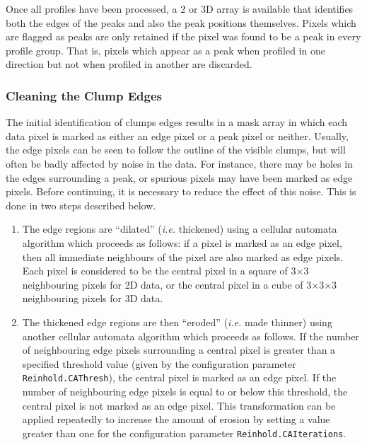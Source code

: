\documentclass[twoside,11pt]{article}
\renewcommand{\_}{\texttt{\symbol{95}}}
\begin{document}
Once all profiles have been processed, a 2 or 3D array is available that
identifies both the edges of the peaks and also the peak positions
themselves. Pixels which are flagged as peaks are only retained if the
pixel was found to be a peak in every profile group. That is, pixels
which appear as a peak when profiled in one direction but not when
profiled in another are discarded.

\subsubsection{Cleaning the Clump Edges}
The initial identification of clumps edges results in a mask array in
which each data pixel is marked as either an edge pixel or a peak pixel
or neither. Usually, the edge pixels can be seen to follow the outline of
the visible clumps, but will often be badly affected by noise in the
data. For instance, there may be holes in the edges surrounding a peak,
or spurious pixels may have been marked as edge pixels. Before
continuing, it is necessary to reduce the effect of this noise. This is
done in two steps described below.

\begin{enumerate}
\item The edge regions are ``dilated'' (\emph{i.e.} thickened) using a
cellular automata algorithm which proceeds as follows: if a pixel is
marked as an edge pixel, then all immediate neighbours of the pixel are
also marked as edge pixels. Each pixel is considered to be the central
pixel in a square of 3$\times$3 neighbouring pixels for 2D data, or the central
pixel in a cube of 3$\times$3$\times$3 neighbouring pixels for 3D data.

\item The thickened edge regions are then ``eroded'' (\emph{i.e.} made
thinner) using another cellular automata algorithm which proceeds as follows.
If the number of neighbouring edge pixels surrounding a central pixel is
greater than a specified threshold value (given by the configuration
parameter {\tt Reinhold.CAThresh}), the central pixel is marked as
an edge pixel. If the number of neighbouring edge pixels is equal to or
below this threshold, the central pixel is not marked as an edge pixel.
This transformation can be applied repeatedly to increase the amount of
erosion by setting a value greater than one for the configuration parameter
{\tt Reinhold.CAIterations}.

\end{enumerate}
\end{document}

